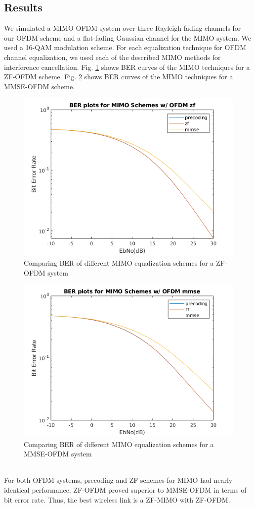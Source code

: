 \documentclass[conference]{IEEEtran}
\begin{document}
\subsection{Results}
We simulated a MIMO-OFDM system over three Rayleigh fading channels for our OFDM scheme and a flat-fading Gaussian channel for the MIMO system. We used a 16-QAM modulation scheme. For each equalization technique for OFDM channel equalization, we used each of the described MIMO methods for interference cancellation. Fig. \ref{fig:mimo-ofdm1} shows BER curves of the MIMO techniques for a ZF-OFDM scheme. Fig. \ref{fig:mimo-ofdm2} shows BER curves of the MIMO techniques for a MMSE-OFDM scheme.
\begin{figure}[htbp]
\centerline{\includegraphics[scale=.4]{./media/mimo_ofdm_01.png}}
\caption{Comparing BER of different MIMO equalization schemes for a ZF-OFDM system}
\label{fig:mimo-ofdm1}
\end{figure}
\begin{figure}[htbp]
\centerline{\includegraphics[scale=.4]{./media/mimo_ofdm_02.png}}
\caption{Comparing BER of different MIMO equalization schemes for a MMSE-OFDM system}
\label{fig:mimo-ofdm2}
\end{figure}\\ 
For both OFDM systems, precoding and ZF schemes for MIMO had nearly identical performance. ZF-OFDM proved superior to MMSE-OFDM in terms of bit error rate. Thus, the best wireless link is a ZF-MIMO with ZF-OFDM.
\end{document}
